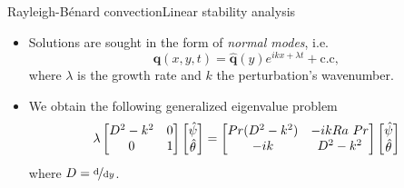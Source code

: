 \documentclass[usenames,dvipsnames,svgnames,10pt,aspectratio=169]{beamer}
\begin{document}
\begin{frame}[t, c]{Rayleigh-Bénard convection}{Linear stability analysis}
	\begin{itemize}
		\item Solutions are sought in the form of \emph{normal modes}, i.e.\
		$$\bm{q}(x, y, t) = \hat{\bm{q}}(y) e^{ikx + \lambda t} + \mathrm{c.c},$$
		where $\lambda$ is the growth rate and $k$ the perturbation's wavenumber.

		\bigskip

		\item We obtain the following generalized eigenvalue problem
		\begin{equation}
			\lambda
			\begin{bmatrix}
				D^2 - k^2 & 0 \\
				0 & 1
			\end{bmatrix}
			\begin{bmatrix}
				\hat{\psi} \\
				\hat{\theta}
			\end{bmatrix}
			=
			\begin{bmatrix}
				Pr (D^2 - k^2) & -ik Ra\ Pr \\
				-ik & D^2-k^2
			\end{bmatrix}
			\begin{bmatrix}
				\hat{\psi} \\
				\hat{\theta}
			\end{bmatrix}
			\notag
		\end{equation}
		where $D = \nicefrac{\mathrm{d}}{\mathrm{d}y}$.
	\end{itemize}

	\vspace{1cm}
\end{frame}
\end{document}
